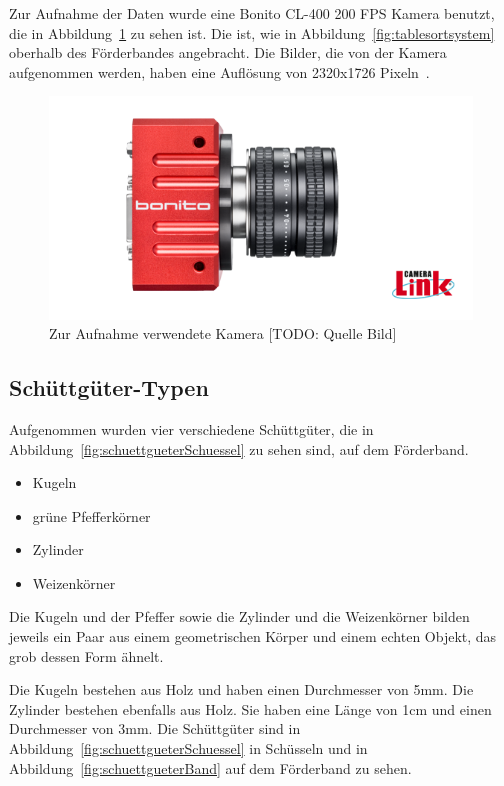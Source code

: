 Zur Aufnahme der Daten wurde eine Bonito CL-400 200 FPS Kamera benutzt, die in Abbildung~\ref{pictureCam} zu sehen ist.
Die ist, wie in Abbildung~\ref{fig:tablesortsystem} oberhalb des Förderbandes angebracht.
Die Bilder, die von der Kamera aufgenommen werden, haben eine Auflösung von 2320x1726 Pixeln~\cite{alliedvisiontechnologiesgmbh2014}.

\begin{figure}[h]
    \centering
    \includegraphics[width=\textwidth]{img/banner-Bonito_cropped}
    \caption{Zur Aufnahme verwendete Kamera [TODO: Quelle Bild]}
    \label{pictureCam}
\end{figure}

\subsection{Schüttgüter-Typen}

Aufgenommen wurden vier verschiedene Schüttgüter, die in Abbildung~\ref{fig:schuettgueterSchuessel} zu sehen sind, auf dem Förderband.

\begin{itemize}
    \item Kugeln
    \item grüne Pfefferkörner
    \item Zylinder
    \item Weizenkörner
\end{itemize}

Die Kugeln und der Pfeffer sowie die Zylinder und die Weizenkörner bilden jeweils 
ein Paar aus einem geometrischen Körper und einem echten Objekt, das grob dessen Form ähnelt.

Die Kugeln bestehen aus Holz und haben einen Durchmesser von 5\si{\milli\metre}.
Die Zylinder bestehen ebenfalls aus Holz. Sie haben eine Länge von 1\si{\centi\metre} und einen Durchmesser von 3\si{\milli\metre}.
Die Schüttgüter sind in Abbildung~\ref{fig:schuettgueterSchuessel} in Schüsseln 
und in Abbildung~\ref{fig:schuettgueterBand} auf dem Förderband zu sehen.


